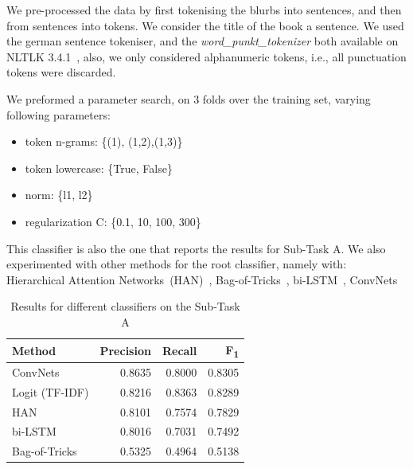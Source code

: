 \documentclass[11pt,a4paper]{article}
\begin{document}
We pre-processed the data by first tokenising the blurbs into sentences, and then
from sentences into tokens. We consider the title of the book a sentence. We used
the german sentence tokeniser, and the \textit {word\_punkt\_tokenizer} both available
on NLTLK 3.4.1~\cite{Bird:2009:NLP:1717171}, also, we only considered alphanumeric
tokens, i.e., all punctuation tokens were discarded.


We preformed a parameter search, on 3 folds over the training set, varying following parameters:

\begin{itemize}
\item token n-grams: \{(1), (1,2),(1,3)\}
\item token lowercase: \{True, False\}
\item norm: \{l1, l2\}
\item regularization C: \{0.1, 10, 100, 300\}
\end{itemize}

This classifier is also the one that reports the results for Sub-Task A. We also experimented with
other methods for the root classifier, namely with: Hierarchical Attention Networks~(HAN)~\cite{yang-etal-2016-hierarchical},
Bag-of-Tricks~\cite{joulin-etal-2017-bag}, bi-LSTM~\cite{Hochreiter:1997:LSM:1246443.1246450}, ConvNets~\cite{kim-2014-convolutional}


\begin{table}
\begin{center}
\begin{tabular}{|l|r|r|r|}
\hline\centering\textbf{Method}  & \textbf{Precision} &  \textbf{Recall} &  \textbf{F\textsubscript{1}}\\
\hline
 ConvNets       & 0.8635 & 0.8000 & 0.8305 \\
 Logit (TF-IDF) & 0.8216 & 0.8363 & 0.8289 \\
 HAN            & 0.8101 & 0.7574 & 0.7829 \\
 bi-LSTM        & 0.8016 & 0.7031 & 0.7492 \\
 Bag-of-Tricks  & 0.5325 & 0.4964 & 0.5138 \\

\hline
\end{tabular}
\end{center}
\caption{\label{devset-results} Results for different classifiers on the Sub-Task A}
\end{table}
\end{document}
